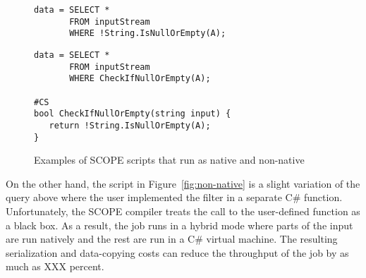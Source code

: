 
\begin{figure}[ht]
 \begin{minipage}[b]{\linewidth}
  
   \begin{verbatim}
data = SELECT *
       FROM inputStream
       WHERE !String.IsNullOrEmpty(A);
\end{verbatim}

    \label{fig:native}
  \end{minipage}
  \begin{minipage}[b]{\linewidth}
   \begin{verbatim}
data = SELECT *
       FROM inputStream
       WHERE CheckIfNullOrEmpty(A);

#CS
bool CheckIfNullOrEmpty(string input) {
   return !String.IsNullOrEmpty(A);
}
    \end{verbatim}

    \label{fig:non-native}
  \end{minipage}


\caption{Examples of SCOPE scripts that run as native and non-native}
\label{fig:example}
\end{figure}

On the other hand, the script in Figure~\ref{fig:non-native} is a slight variation of the query above where the user implemented the filter in a separate C\# function. Unfortunately, the SCOPE compiler treats the call to the user-defined function as a black box. As a result, the job runs in a hybrid mode where parts of the input are run natively and the rest are run in a C\# virtual machine. The resulting serialization and data-copying costs can reduce the throughput of the job by as much as XXX percent. 


